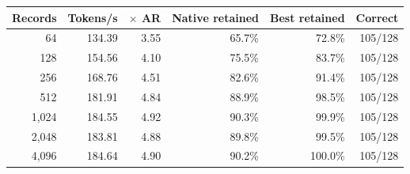 \begin{tabular}{rrrrrr}
\toprule
Records & Tokens/s & $\times$ AR & Native retained & Best retained & Correct \\
\midrule
64 & 134.39 & 3.55 & 65.7\% & 72.8\% & 105/128 \\
128 & 154.56 & 4.10 & 75.5\% & 83.7\% & 105/128 \\
256 & 168.76 & 4.51 & 82.6\% & 91.4\% & 105/128 \\
512 & 181.91 & 4.84 & 88.9\% & 98.5\% & 105/128 \\
1,024 & 184.55 & 4.92 & 90.3\% & 99.9\% & 105/128 \\
2,048 & 183.81 & 4.88 & 89.8\% & 99.5\% & 105/128 \\
4,096 & 184.64 & 4.90 & 90.2\% & 100.0\% & 105/128 \\
\bottomrule
\end{tabular}
